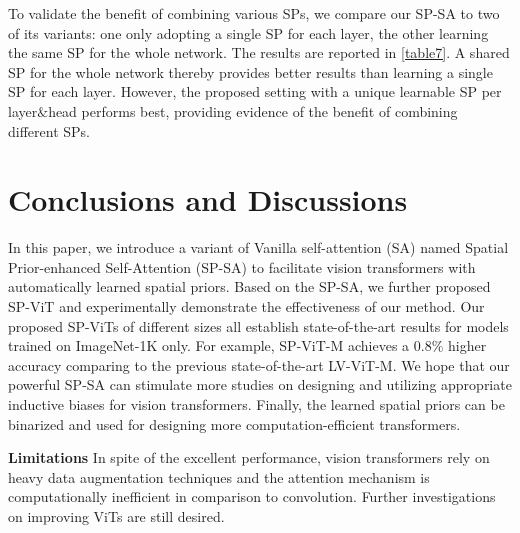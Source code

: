 \documentclass[authorversion, sigconf, acmthm=false, nonacm=true]{acmart}
\begin{document}
To validate the benefit of combining various SPs,
we compare our SP-SA to two of its variants: 
one only adopting a single SP for each layer, the other learning the same SP for the whole network. 
The results are reported in \cref{table7}. A shared SP for the whole network thereby provides better results than learning a single SP for each layer. However, the proposed setting with a unique learnable SP per layer$\&$head performs best, providing evidence of the benefit of combining different SPs. 





\section{Conclusions and Discussions}

In this paper, we introduce a variant of Vanilla self-attention (SA) named Spatial Prior-enhanced Self-Attention (SP-SA) to facilitate vision transformers with automatically learned spatial priors.
Based on the SP-SA, we further proposed SP-ViT and experimentally demonstrate the effectiveness of our method. Our proposed SP-ViTs of different sizes all establish state-of-the-art results for models trained on ImageNet-1K only. For example, SP-ViT-M achieves a $0.8\%$ higher accuracy comparing to the previous state-of-the-art LV-ViT-M.  
We hope that our powerful SP-SA can stimulate more studies on designing and utilizing appropriate inductive biases
for vision transformers. Finally, the learned spatial priors can be binarized and used for designing more computation-efficient
transformers.

\noindent\textbf{Limitations} In spite of the excellent performance, vision transformers rely on heavy data augmentation techniques and the attention mechanism is computationally inefficient in comparison to convolution. Further investigations on improving ViTs are still desired.

\clearpage




\appendix
\end{document}

